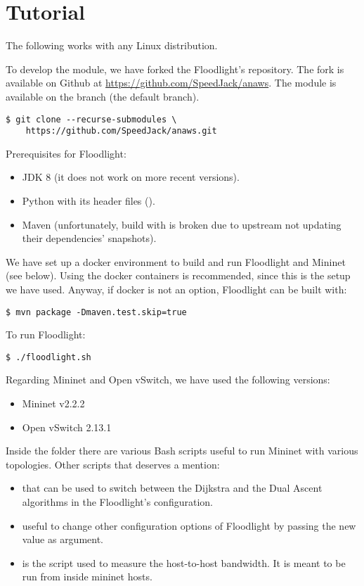 \chapter{Tutorial}\label{appendix:tutorial}

The following works with any Linux distribution.

To develop the module, we have forked the Floodlight's repository. The fork is
available on Github at \url{https://github.com/SpeedJack/anaws}. The module is
available on the  branch (the default branch).

\begin{verbatim}
$ git clone --recurse-submodules \
    https://github.com/SpeedJack/anaws.git
\end{verbatim}

Prerequisites for Floodlight:
\begin{itemize}
	\item JDK 8 (it does not work on more recent versions).
	\item Python with its header files ().
	\item Maven (unfortunately, build with  is broken due to
		upstream not updating their dependencies' snapshots).
\end{itemize}

We have set up a docker environment to build and run Floodlight and Mininet (see
below). Using the docker containers is recommended, since this is the setup we
have used. Anyway, if docker is not an option, Floodlight can be built with:

\begin{verbatim}
$ mvn package -Dmaven.test.skip=true
\end{verbatim}

To run Floodlight:

\begin{verbatim}
$ ./floodlight.sh
\end{verbatim}

Regarding Mininet and Open vSwitch, we have used the following versions:
\begin{itemize}
	\item Mininet v2.2.2
	\item Open vSwitch 2.13.1
\end{itemize}

Inside the  folder there are various Bash scripts useful to run
Mininet with various topologies. Other scripts that deserves a mention:
\begin{itemize}
	\item {} that can be used to switch
		between the Dijkstra and the Dual Ascent algorithms in the
		Floodlight's configuration.
	\item {} useful to change other configuration
		options of Floodlight by passing the new value as argument.
	\item {} is the script used to measure the
		host-to-host bandwidth. It is meant to be run from inside
		mininet hosts.
\end{itemize}


